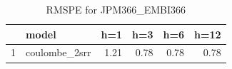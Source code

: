 \begin{table}[ht]
\centering
\begin{tabular}{rlrrrr}
  \hline
 & model & h=1 & h=3 & h=6 & h=12 \\ 
  \hline
1 & coulombe\_2srr & 1.21 & 0.78 & 0.78 & 0.78 \\ 
   \hline
\end{tabular}
\caption{RMSPE for JPM366_EMBI366} 
\end{table}

